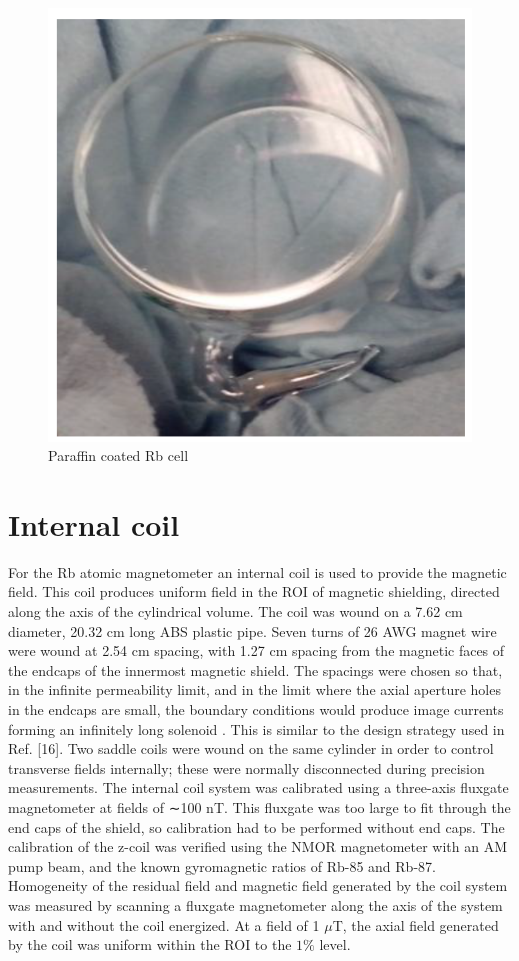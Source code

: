 \documentclass[12pt]{report}
\begin{document}
\begin{figure}[h]
\centering
\includegraphics[width=0.5\linewidth]{figures/cell}
\caption{Paraffin coated Rb cell}
\end{figure}
\newpage
\section{Internal coil}
 For the Rb atomic magnetometer an internal coil is used to provide the magnetic field. This coil produces uniform field in the ROI of magnetic shielding, directed along the axis of the cylindrical volume. The coil was wound on a 7.62 cm diameter, 20.32 cm long ABS plastic pipe. Seven turns of 26 AWG magnet wire were wound at 2.54 cm spacing, with 1.27 cm spacing from the magnetic faces of the endcaps of the innermost magnetic shield. The spacings were chosen so that, in the infinite permeability limit, and in the limit where the axial aperture holes in the endcaps are small, the boundary conditions would produce image currents forming an infinitely long solenoid . This is similar to the design strategy used in Ref. [16]. Two saddle coils were wound on the same cylinder in order to control transverse fields internally; these were normally disconnected during precision measurements. The internal coil system was calibrated using a three-axis fluxgate magnetometer at fields of ∼100 nT. This fluxgate was too large to fit through the end caps of the shield, so calibration
had to be performed without end caps. The calibration of the z-coil was verified using the NMOR magnetometer with an AM pump beam, and the known gyromagnetic ratios of Rb-85 and Rb-87. Homogeneity of the residual field and magnetic field generated by the coil system was measured by scanning a fluxgate magnetometer along the axis of the system with and without the coil energized. At a field of 1 $\mu$T, the axial field generated by the coil was uniform within the ROI to the $1\%$  level.
\end{document}
